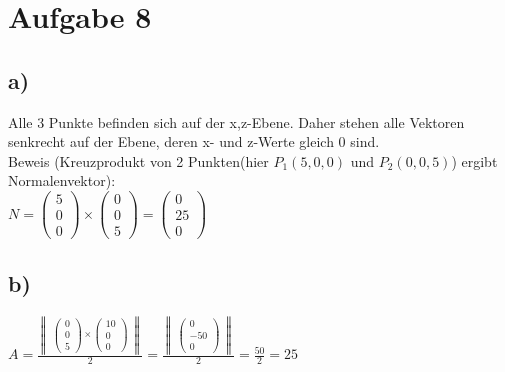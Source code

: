 \section*{Aufgabe 8}
\subsection*{a)}
Alle 3 Punkte befinden sich auf der x,z-Ebene. Daher stehen alle Vektoren senkrecht auf der Ebene, deren x- und z-Werte gleich 0 sind.\\
Beweis (Kreuzprodukt von 2 Punkten(hier $P_1(5,0,0)$ und $P_2(0,0,5)$) ergibt Normalenvektor):\\
$
N = 
\begin{pmatrix}
5 \\
0 \\
0
\end{pmatrix}
\times
\begin{pmatrix}
0 \\
0 \\
5
\end{pmatrix}
=
\begin{pmatrix}
0 \\
25 \\
0
\end{pmatrix}
$
\subsection*{b)}
$
A = \frac{
\begin{Vmatrix}
\begin{pmatrix}
0 \\
0 \\
5
\end{pmatrix}
\times
\begin{pmatrix}
10 \\
0 \\
0
\end{pmatrix}
\end{Vmatrix}
}{2}
= \frac{
\begin{Vmatrix}
\begin{pmatrix}
0 \\
-50 \\
0
\end{pmatrix}
\end{Vmatrix}
}{2} = \frac{50}{2} = 25
$